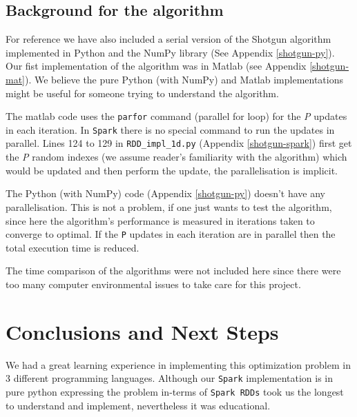 \documentclass[a4paper,11pt]{article}
\begin{document}
\subsection{Background for the algorithm}
For reference we have also included a serial version of the Shotgun algorithm implemented in Python and the NumPy library (See Appendix \ref{shotgun-py}). Our fist implementation of the algorithm was in Matlab (see Appendix \ref{shotgun-mat}). We believe the pure Python (with NumPy) and Matlab implementations might be useful for someone trying to understand the algorithm.\par
The matlab code uses the \texttt{parfor} command (parallel for loop) for the \textit{P} updates in each iteration. In \texttt{Spark} there is no special command to run the updates in parallel. Lines 124 to 129 in \texttt{RDD\_impl\_1d.py} (Appendix \ref{shotgun-spark}) first get the \textit{P} random indexes (we assume reader's familiarity with the algorithm) which would be updated and then perform the update, the parallelisation is implicit.\par
The Python (with NumPy) code (Appendix \ref{shotgun-py}) doesn't have any parallelisation. This is not a problem, if one just wants to test the algorithm, since here the algorithm's performance is measured in iterations taken to converge to optimal. If the \texttt{P} updates in each iteration are in parallel then the total execution time is reduced.

The time comparison of the algorithms were not included here since there were too many computer environmental issues to take care for this project. 

\section{Conclusions and Next Steps}

We had a great learning experience in implementing this optimization problem in 3 different programming languages. Although our \texttt{Spark} implementation is in pure python expressing the problem in-terms of \texttt{Spark RDDs} took us the longest to understand and implement, nevertheless it was educational. \par
\end{document}
